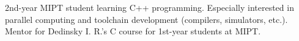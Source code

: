 \documentclass[9pt]{developercv} %
\begin{document}
\vspace{0.5cm}



\begin{minipage}[t]{0.4\textwidth} %
        \vspace{-\baselineskip} %
        2nd-year MIPT student learning C++ programming. Especially interested in parallel computing and toolchain development (compilers, simulators, etc.). Mentor for Dedinsky I. R.'s C course for 1st-year students at MIPT.

\end{minipage}
\hfill %
\begin{minipage}[t]{0.5\textwidth} %
        \vspace{-\baselineskip} %
        \begin{barchart}{5.5}
        \end{barchart}
\end{minipage}



\end{document}
